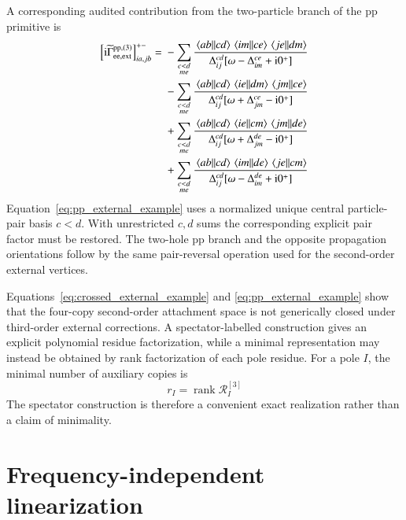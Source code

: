 \documentclass[aip,jcp,reprint,noshowkeys,superscriptaddress]{revtex4-1}
\newcommand{\ii}{\mathrm{i}}
\newcommand{\ee}{\text{ee}}
\newcommand{\pp}{\text{pp}}
\begin{document}
A corresponding audited contribution from the two-particle branch of the $\pp$ primitive is
\begin{equation}
	\begin{split}
	\left[
	\ii\widetilde\Gamma^{\pp,(3)}_{\ee,\rm ext}
	\right]^{+-}_{ia,jb}
	={}&
	-
	\sum_{\substack{c<d\\me}}
	\frac{
	\mel{ab}{}{cd}
	\mel{im}{}{ce}
	\mel{je}{}{dm}
	}{
	\Delta_{ij}^{cd}
	[\omega-\Delta_{im}^{ce}+\ii0^+]
	}
	\\
	&-
	\sum_{\substack{c<d\\me}}
	\frac{
	\mel{ab}{}{cd}
	\mel{ie}{}{dm}
	\mel{jm}{}{ce}
	}{
	\Delta_{ij}^{cd}
	[\omega+\Delta_{jm}^{ce}-\ii0^+]
	}
	\\
	&+
	\sum_{\substack{c<d\\me}}
	\frac{
	\mel{ab}{}{cd}
	\mel{ie}{}{cm}
	\mel{jm}{}{de}
	}{
	\Delta_{ij}^{cd}
	[\omega+\Delta_{jm}^{de}-\ii0^+]
	}
	\\
	&+
	\sum_{\substack{c<d\\me}}
	\frac{
	\mel{ab}{}{cd}
	\mel{im}{}{de}
	\mel{je}{}{cm}
	}{
	\Delta_{ij}^{cd}
	[\omega-\Delta_{im}^{de}+\ii0^+]
	}
	\end{split}
	\label{eq:pp_external_example}
\end{equation}
Equation~\eqref{eq:pp_external_example} uses a normalized unique central particle-pair basis $c<d$.
With unrestricted $c,d$ sums the corresponding explicit pair factor must be restored.
The two-hole pp branch and the opposite propagation orientations follow by the same pair-reversal operation used for the second-order external vertices.

Equations~\eqref{eq:crossed_external_example} and \eqref{eq:pp_external_example} show that the four-copy second-order attachment space is not generically closed under third-order external corrections.
A spectator-labelled construction gives an explicit polynomial residue factorization, while a minimal representation may instead be obtained by rank factorization of each pole residue.
For a pole $I$, the minimal number of auxiliary copies is
\begin{equation}
	r_I
	=
	\operatorname{rank}
	\mathcal R_I^{[3]}
	\label{eq:minimal_rank}
\end{equation}
The spectator construction is therefore a convenient exact realization rather than a claim of minimality.

\section[Frequency-independent linearization]{Frequency-independent linearization}
\label{sec:linearization}
\end{document}
